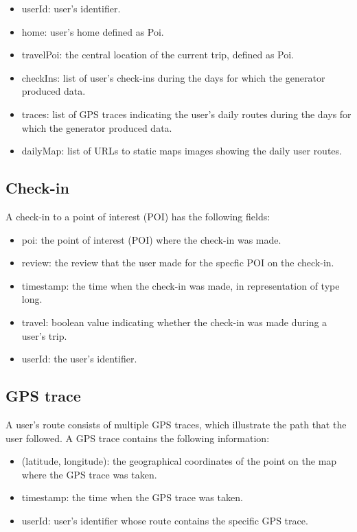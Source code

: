 \begin{itemize}
 \item userId: user's identifier.
 \item home: user's home defined as Poi.
 \item travelPoi: the central location of the current trip, defined as Poi.
 \item checkIns: list of user's check-ins during the days for which the generator produced data.
 \item traces: list of GPS traces indicating the user's daily routes during the days for which the generator produced data.
 \item dailyMap: list of URLs to static maps images showing the daily user routes.
\end{itemize}

\subsection{Check-in}

A check-in to a point of interest (POI) has the following fields:

\begin{itemize}
 \item poi: the point of interest (POI) where the check-in was made.
 \item review: the review that the user made for the specfic POI on the check-in.
 \item timestamp: the time when the check-in was made, in representation of type long.
 \item travel: boolean value indicating whether the check-in was made during a user's trip.
 \item userId: the user's identifier.
\end{itemize}

\subsection{GPS trace}

A user's route consists of multiple GPS traces, which illustrate the path that the user followed. A GPS trace contains the following information:

\begin{itemize}
 \item (latitude, longitude): the geographical coordinates of the point on the map where the GPS trace was taken.
 \item timestamp: the time when the GPS trace was taken.
 \item userId: user's identifier whose route contains the specific GPS trace.
\end{itemize}

